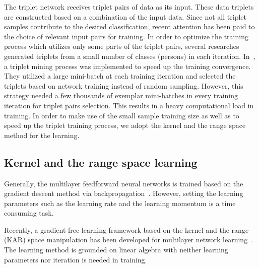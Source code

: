 \documentclass{sig-alternate-05-2015}
\begin{document}
The triplet network receives triplet pairs of data as its input. These data triplets are constructed based on a combination of the input data. Since not all triplet samples contribute to the desired classification, recent attention has been paid to the choice of relevant input pairs for training. In order to optimize the training process which utilizes only some parts of the triplet pairs, several researches~\cite{cheng2016person,ding2015deep,wang2016joint} generated triplets from a small number of classes (persons) in each iteration. In~\cite{schroff2015facenet}, a triplet mining process was implemented to speed up the training convergence. They utilized a large mini-batch at each training iteration and selected the triplets based on network training instead of random sampling. However, this strategy needed a few thousands of exemplar mini-batches in every training iteration for triplet pairs selection. This results in a heavy computational load in training. In order to make use of the small sample training size as well as to speed up the triplet training process, we adopt the kernel and the range space method for the learning.

\subsection{Kernel and the range space learning}\label{kar}

Generally, the multilayer feedforward neural networks is trained based on the gradient descent method via backpropagation~\cite{goodfellow2016deep}.
However, setting the learning parameters such as the learning rate and the learning momentum is a time consuming task.

Recently, a gradient-free learning framework based on the kernel and the range (KAR) space manipulation has been developed for multilayer network learning~\cite{toh100,toh2018learning,toh2018analytic,toh2018gradient}.
The learning method is grounded on linear algebra with neither learning parameters nor iteration is needed in training.
\end{document}
